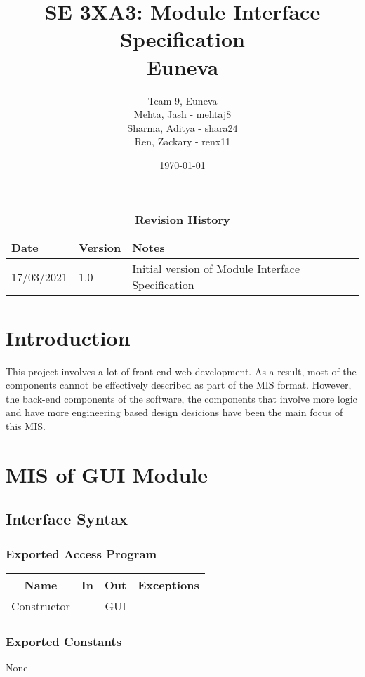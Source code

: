 \documentclass[12pt, titlepage]{article}
\title{SE 3XA3: Module Interface Specification\\Euneva}
\author{Team 9, Euneva
		\\ Mehta, Jash - mehtaj8
		\\ Sharma, Aditya - shara24
		\\ Ren, Zackary - renx11
}
\date{\today}
\begin{document}
\maketitle

\tableofcontents
\listoftables
\listoffigures

\begin{table}[bp]
\begin{tabularx}{\textwidth}{p{3cm}p{2cm}X}
\toprule {\bf Date} & {\bf Version} & {\bf Notes}\\
\midrule
17/03/2021 & 1.0 & Initial version of Module Interface Specification\\
\bottomrule
\end{tabularx}
\caption{\bf Revision History}
\end{table}

\newpage

\section{Introduction}
This project involves a lot of front-end web development. As a result,
most of the components cannot be effectively described as part of the MIS format.
However, the back-end components of the software, the components that involve
more logic and have more engineering based design desicions have been the main
focus of this MIS.

\newpage

\section{MIS of GUI Module}
\subsection{Interface Syntax}
\subsubsection{Exported Access Program}
\begin{tabular}[pos]{|c|c|c|c|}
    \hline
    \textbf{Name}& \textbf{In} & \textbf{Out} & \textbf{Exceptions} \\ \hline
    Constructor & - & GUI & -\\ \hline
\end{tabular}
\subsubsection{Exported Constants}
None
\end{document}
